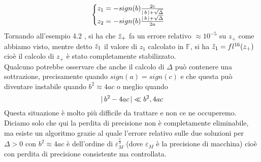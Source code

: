 \documentclass[12pt]{article}
\DeclarePairedDelimiter{\abs}{\lvert}{\rvert}
\begin{document}
\[ \begin{cases}
    z_1 = - sign(b)\frac{2c}{\abs{\,b\,} + \sqrt{\Delta}} \\
    z_2 = - sign(b)\frac{\abs{\,b\,} + \sqrt{\Delta}}{2a}
\end{cases}\]
Tornando all'esempio 4.2 , si ha che $\Tilde{z}_+$ fa un errore relativo $\approx 10^{-5}$ su $z_+$ come abbiamo visto, mentre detto $\Tilde{z}_1$ il valore di $z_1$ calcolato in $\mathbb{F}$, si ha $\Tilde{z}_1 = fl^{16}(z_+)$ cioè il calcolo di $z_+$ è stato completamente stabilizzato.\\
Qualcuno potrebbe osservare che anche il calcolo di $\Delta$ può contenere una sottrazione, precisamente quando $sign(a)=sign(c)$ e che questa può diventare instabile quando $b^2 \approx 4ac$ o meglio quando 
\[\abs{\,b^2 - 4ac\,} \ll b^2,4ac\]
Questa situazione è molto più difficile da trattare e non ce ne occuperemo.\\ Diciamo solo che qui la perdita di precisione non è completamente eliminabile, ma esiste un algoritmo grazie al quale l’errore relativo sulle due soluzioni per $\Delta>0$ con $b^2 \approx 4ac$ è dell’ordine di $\varepsilon_M^{\frac{1}{3}}$ (dove $\varepsilon_M$ è la precisione di macchina) cioè con perdita di precisione consistente ma controllata.
\end{document}
